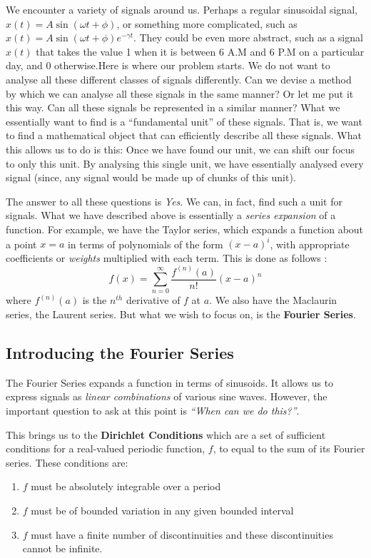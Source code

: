 \documentclass{article}
\theoremstyle{definition}
\begin{document}
	We encounter a variety of signals around us. Perhaps a regular sinusoidal signal, $x(t) = A\sin(\omega t + \phi)$, or something more complicated, such as $x(t) = A\sin(\omega t + \phi) e^{-\gamma t}$. They could be even more abstract, such as a signal $x(t)$ that takes the value 1 when it is between 6 A.M and 6 P.M on a particular day, and 0 otherwise.Here is where our problem starts. We do not want to analyse all these different classes of signals differently. Can we devise a method by which we can analyse all these signals in the same manner? Or let me put it this way. Can all these signals be represented in a similar manner? What we essentially want to find is a ``fundamental unit'' of these signals. That is, we want to find a mathematical object that can efficiently describe all these signals. What this allows us to do is this: Once we have found our unit, we can shift our focus to only this unit. By analysing this single unit, we have essentially analysed every signal (since, any signal would be made up of chunks of this unit). \smallskip
	
	 The answer to all these questions is \textit{Yes}. We can, in fact, find such a unit for signals. What we have described above is essentially a \textit{series expansion} of a function. For example, we have the Taylor series, which expands a function about a point $x=a$ in terms of polynomials of the form $(x-a)^i$, with appropriate coefficients or \textit{weights} multiplied with each term. This is done as follows : 
	 \[ f(x) = \sum_{n=0}^{\infty} \frac{f^{(n)}(a)}{n!} (x-a)^n\]
	 where $f^{(n)}(a)$ is the $n^{th}$ derivative of $f$ at $a$. We also have the Maclaurin series, the Laurent series. But what we wish to focus on, is the \textbf{Fourier Series}.
	 \subsection{Introducing the Fourier Series}
	 
    The Fourier Series expands a function in terms of sinusoids. It allows us to express signals as \textit{linear combinations} of various sine waves. However, the important question to ask at this point is \textit{``When can we do this?''}. \smallskip
	 
	This brings us to the \textbf{Dirichlet Conditions} which are a set of sufficient conditions for a real-valued periodic function, $f$, to equal to the sum of its Fourier series. These conditions are:
	 
	 \begin{enumerate}
	     \item $f$ must be absolutely integrable over a period
	     \item $f$ must be of bounded variation in any given bounded interval
	     \item $f$ must have a finite number of discontinuities and these discontinuities cannot be infinite.
	 \end{enumerate}
	 
\end{document}
